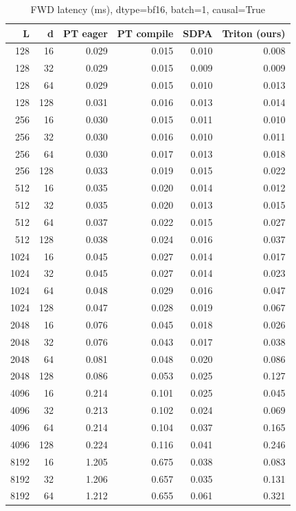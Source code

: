 \documentclass[11pt]{article}
\begin{document}
\begin{table}[H]\small\centering
\caption{FWD latency (ms), dtype=bf16, batch=1, causal=True}
\label{tab:fa2-bf16-fwd}
\begin{tabular}{rrrrrr}
\toprule
L & d & PT eager & PT compile & SDPA & Triton (ours) \\
\midrule
128 & 16 & 0.029 & 0.015 & 0.010 & 0.008 \\
128 & 32 & 0.029 & 0.015 & 0.009 & 0.009 \\
128 & 64 & 0.029 & 0.015 & 0.010 & 0.013 \\
128 & 128 & 0.031 & 0.016 & 0.013 & 0.014 \\
256 & 16 & 0.030 & 0.015 & 0.011 & 0.010 \\
256 & 32 & 0.030 & 0.016 & 0.010 & 0.011 \\
256 & 64 & 0.030 & 0.017 & 0.013 & 0.018 \\
256 & 128 & 0.033 & 0.019 & 0.015 & 0.022 \\
512 & 16 & 0.035 & 0.020 & 0.014 & 0.012 \\
512 & 32 & 0.035 & 0.020 & 0.013 & 0.015 \\
512 & 64 & 0.037 & 0.022 & 0.015 & 0.027 \\
512 & 128 & 0.038 & 0.024 & 0.016 & 0.037 \\
1024 & 16 & 0.045 & 0.027 & 0.014 & 0.017 \\
1024 & 32 & 0.045 & 0.027 & 0.014 & 0.023 \\
1024 & 64 & 0.048 & 0.029 & 0.016 & 0.047 \\
1024 & 128 & 0.047 & 0.028 & 0.019 & 0.067 \\
2048 & 16 & 0.076 & 0.045 & 0.018 & 0.026 \\
2048 & 32 & 0.076 & 0.043 & 0.017 & 0.038 \\
2048 & 64 & 0.081 & 0.048 & 0.020 & 0.086 \\
2048 & 128 & 0.086 & 0.053 & 0.025 & 0.127 \\
4096 & 16 & 0.214 & 0.101 & 0.025 & 0.045 \\
4096 & 32 & 0.213 & 0.102 & 0.024 & 0.069 \\
4096 & 64 & 0.214 & 0.104 & 0.037 & 0.165 \\
4096 & 128 & 0.224 & 0.116 & 0.041 & 0.246 \\
8192 & 16 & 1.205 & 0.675 & 0.038 & 0.083 \\
8192 & 32 & 1.206 & 0.657 & 0.035 & 0.131 \\
8192 & 64 & 1.212 & 0.655 & 0.061 & 0.321 \\

\end{tabular}
\end{table}
\end{document}
